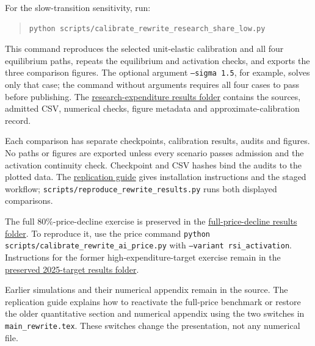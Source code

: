 For the slow-transition sensitivity, run:
\begin{quote}
\small
\begin{verbatim}
python scripts/calibrate_rewrite_research_share_low.py
\end{verbatim}
\end{quote}
This command reproduces the selected unit-elastic calibration and all
four equilibrium paths, repeats the equilibrium and activation checks,
and exports the three comparison figures. The optional argument
\texttt{--sigma 1.5}, for example, solves only that case; the command
without arguments requires all four cases to pass before publishing.
The
\href{https://github.com/oliverpardo1979/AI-Future-Paper-WTF/tree/main/numerical_rewrite/rsi_research_share_2023}
{research-expenditure results folder} contains the sources, admitted CSV,
numerical checks, figure metadata and approximate-calibration record.

Each comparison has separate checkpoints,
calibration results, audits and figures. No paths or figures are exported
unless every scenario passes admission and the activation continuity check.
Checkpoint and CSV hashes bind the audits to the plotted data.
The \href{https://github.com/oliverpardo1979/AI-Future-Paper-WTF/blob/main/REPLICATION.md}
{replication guide} gives installation instructions and the staged workflow;
\texttt{scripts/reproduce\_rewrite\_results.py} runs both displayed comparisons.

The full $80\%$-price-decline exercise is preserved in the
\href{https://github.com/oliverpardo1979/AI-Future-Paper-WTF/tree/main/numerical_rewrite/rsi_activation}
{full-price-decline results folder}. To reproduce it, use the price
command \texttt{python scripts/calibrate\_rewrite\_ai\_price.py}
with \texttt{--variant rsi\_activation}.
Instructions for the former high-expenditure-target exercise remain in the
\href{https://github.com/oliverpardo1979/AI-Future-Paper-WTF/tree/main/numerical_rewrite/rsi_research_share_2025}
{preserved 2025-target results folder}.

Earlier simulations and their numerical appendix remain in the source.
The replication guide explains how to reactivate the full-price benchmark
or restore the older quantitative section and numerical appendix using
the two switches in \texttt{main\_rewrite.tex}.
These switches change the presentation, not any numerical file.
